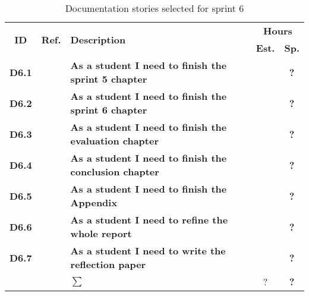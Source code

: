 \begin{table*}[!ht]%
 \def\arraystretch{1.25}
 
 \caption{Documentation stories selected for sprint 6}
   \label{tab:sprint6Documentationstories}

\begin{tabularx}{\textwidth}{ccXcc} 

\toprule[0.5mm]
\multirow{2}{*}{\textbf{ID}} &
\multirow{2}{*}{\textbf{Ref.}} & \multirow{2}{*}{\textbf{Description}} & \multicolumn{2}{c}{\textbf{Hours}} \\
 					& & & \textbf{Est.} & \textbf{Sp.} \\
\midrule

\textbf{D6.1} 	& & {\bf As a student I need to finish the sprint 5 chapter} 		&   & \textbf{?} \\
	
\textbf{D6.2} 	& & {\bf As a student I need to finish the sprint 6 chapter} 		& 	& \textbf{?} \\

\textbf{D6.3} 	& & {\bf As a student I need to finish the evaluation chapter} 		& 	& \textbf{?} \\

\textbf{D6.4} 	&& {\bf As a student I need to finish the conclusion chapter} 		& 	& \textbf{?} \\

\textbf{D6.5} 	&& {\bf As a student I need to finish the Appendix} 				& 	& \textbf{?} \\

\textbf{D6.6} 	&& {\bf As a student I need to refine the whole report} 			& 	& \textbf{?} \\
\textbf{D6.7} 	&& {\bf As a student I need to write the reflection paper} 			& 	& \textbf{?} \\
\midrule
		
				&& \textbf{$\sum$}		&	?	& \textbf{?}
 \\																			
\bottomrule[0.5mm]
\end{tabularx}
\end{table*}
